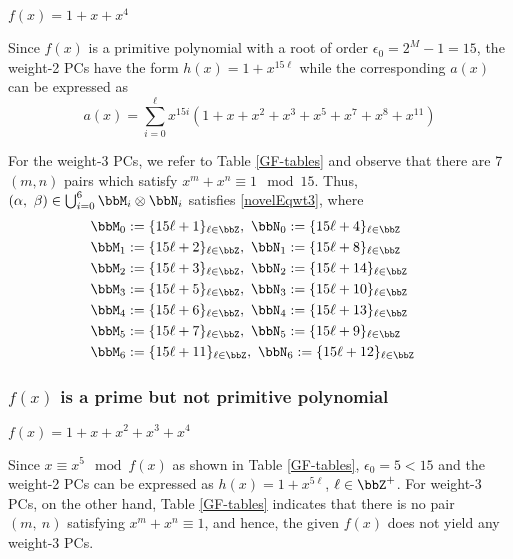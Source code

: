 \begin{example}	$f(x)= 1+x+x^4~$
	
	Since $f(x)$ is a primitive polynomial with a root of order $\epsilon_0=2^M-1=15$, the weight-2 PCs have the form
	$h(x)=1+x^{15\ell}$
	while the corresponding $a(x)$ can be expressed as 
	$$ a(x) = \sum_{i=0}^{\ell} x^{15i} \left(1 +x +x^2 +x^3+x^5+x^7+x^8+x^{11} \right)$$
	
	For the weight-3 PCs, we refer to Table \ref{GF-tables} and observe that there are 7 $(m,n)$ pairs which satisfy $x^m+x^n \equiv 1 \mod 15$. Thus, $(\alpha,~\beta) \in \bigcup_{i=0}^6 \bbM_i\otimes\bbN_i$ satisfies \eqref{novelEqwt3}, where
	\begin{align}
	\bbM_0 &:= \{15\ell + 1\}_{\ell \in \bbZ},~\bbN_0 := \{15\ell + 4\}_{\ell \in \bbZ}\cr
	\bbM_1 &:= \{15\ell + 2\}_{\ell \in \bbZ},~\bbN_1 := \{15\ell + 8\}_{\ell \in \bbZ}\cr
	\bbM_2 &:= \{15\ell + 3\}_{\ell \in \bbZ},~\bbN_2 := \{15\ell + 14\}_{\ell \in \bbZ}\cr
	\bbM_3 &:= \{15\ell + 5\}_{\ell \in \bbZ},~\bbN_3 := \{15\ell + 10\}_{\ell \in \bbZ}\cr
	\bbM_4 &:= \{15\ell + 6\}_{\ell \in \bbZ},~\bbN_4 := \{15\ell + 13\}_{\ell \in \bbZ}\cr
	\bbM_5 &:= \{15\ell + 7\}_{\ell \in \bbZ},~\bbN_5 := \{15\ell + 9\}_{\ell \in \bbZ}\cr
	\bbM_6 &:= \{15\ell + 11\}_{\ell \in \bbZ},~\bbN_6 := \{15\ell + 12\}_{\ell \in \bbZ}
	\end{align}
	\label{Ex:2}	
\end{example}

\subsubsection{$f(x)$ is a prime but not primitive polynomial}

\begin{example}
$f(x)=1+x+x^2+x^3+x^4$

Since $x\equiv x^5 \mod f(x)$ as shown in Table \ref{GF-tables}, $\epsilon_0=5< 15$ and the weight-2 PCs can be expressed as $h(x)=1+x^{5\ell}$, $\ell \in \bbZ^+$. For weight-3 PCs, on the other hand, Table \ref{GF-tables} indicates that there is no pair $(m,~n)$ satisfying $x^m+x^n \equiv 1$, and hence, the given $f(x)$ does not yield any weight-3 PCs.
\label{Ex:3}
\end{example}

